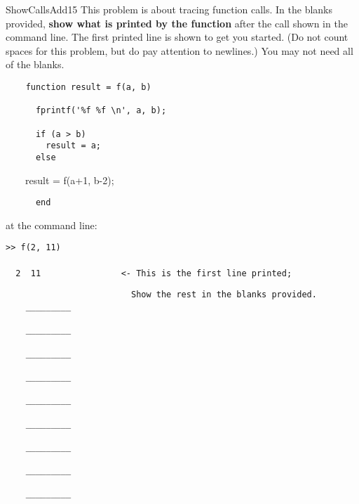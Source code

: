 \documentclass[master]{exam}
\begin{document}
\begin{problem}[require=careful]{ShowCallsAdd}{15}
    This problem is about tracing function calls. In the blanks provided,
    \textbf{show what is printed by the function} after the call shown in the
    command line. The first printed line is shown to get you started. (Do not count spaces for this problem, but do pay attention to newlines.) You may not need all of the blanks.
    \begin{verbatim}
    function result = f(a, b)
      
      fprintf('%f %f \n', a, b);
      
      if (a > b)
        result = a;
      else\end{verbatim}
    \ \ \ \ result = f(a+1, b-2);
    \begin{verbatim}
      end
    \end{verbatim}

    at the command line:

    \texttt{>> f(2, 11)\\
    \\%
    \ \ 2 \ 11\ \ \ \ \ \ \ \ \ \ \ \ \ \ \ \ <- This is the first line printed;}
    \begin{verbatim}
                         Show the rest in the blanks provided.
    _________

    _________

    _________

    _________

    _________

    _________

    _________

    _________

    _________
    \end{verbatim}
\end{problem}
\end{document}
